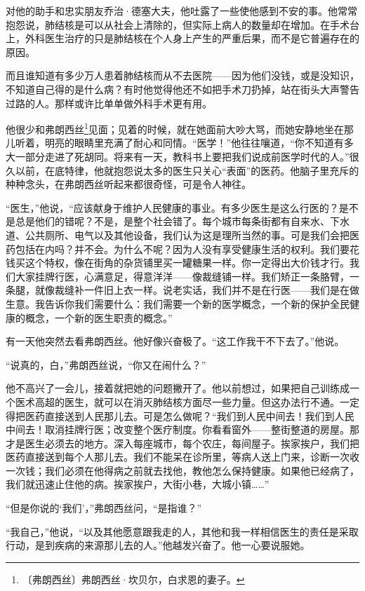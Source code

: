\documentclass[12pt,UTF-8,openany]{ctexbook}
\begin{document}
\begin{normalsize}
    对他的助手和忠实朋友乔治·德塞大夫，他吐露了一些使他感到不安的事。他常常抱怨说，肺结核是可以从社会上清除的，但实际上病人的数量却在增加。在手术台上，外科医生治疗的只是肺结核在个人身上产生的严重后果，而不是它普遍存在的原因。
    
    而且谁知道有多少万人患着肺结核而从不去医院——因为他们没钱，或是没知识，不知道自己得的是什么病？有时他觉得他还不如把手术刀扔掉，站在街头大声警告过路的人。那样或许比单单做外科手术更有用。
    
    他很少和弗朗西丝\footnote{〔弗朗西丝〕弗朗西丝·坎贝尔，白求恩的妻子。}见面；见着的时候，就在她面前大吵大骂，而她安静地坐在那儿听着，明亮的眼睛里充满了耐心和同情。“医学！”他往往嚷道，“你不知道有多大一部分走进了死胡同。将来有一天，教科书上要把我们说成前医学时代的人。”很久以前，在底特律，他就抱怨说太多的医生只关心“表面”的医药。他脑子里充斥的种种念头，在弗朗西丝听起来都很奇怪，可是令人神往。
    
    “医生，”他说，“应该献身于维护人民健康的事业。有多少医生是这么行医的？是不是总是他们的错呢？不是，是整个社会错了。每个城市每条街都有自来水、下水道、公共厕所、电气以及其他设备，我们认为这是理所当然的事。可是我们会把医药包括在内吗？并不会。为什么不呢？因为人没有享受健康生活的权利。我们要花钱买这个特权，像在街角的杂货铺里买一罐糖果一样。你一定得出大价钱才行。我们大家挂牌行医，心满意足，得意洋洋——像裁缝铺一样。我们矫正一条胳臂，一条腿，就像裁缝补一件旧上衣一样。说老实话，我们并不是在行医——我们是在做生意。我告诉你我们需要什么：我们需要一个新的医学概念，一个新的保护全民健康的概念，一个新的医生职责的概念。”
    
    有一天他突然去看弗朗西丝。他好像兴奋极了。“这工作我干不下去了。”他说。
    
    “说真的，白，”弗朗西丝说，“你又在闹什么？”
    
    他不高兴了一会儿，接着就把她的问题撇开了。他以前想过，如果把自己训练成一个医术高超的医生，就可以在消灭肺结核方面尽一些力量。但这办法行不通。一定得把医药直接送到人民那儿去。可是怎么做呢？“我们到人民中间去！我们到人民中间去！取消挂牌行医；改变整个医疗制度。你看看窗外——整街整道的房屋。那才是医生必须去的地方。深入每座城市，每个农庄，每间屋子。挨家挨户，我们把医药直接送到每个人那儿去。我们不能呆在诊所里，等病人送上门来，诊断一次收一次钱；我们必须在他得病之前就去找他，教他怎么保持健康。如果他已经病了，我们就迅速止住他的病。挨家挨户，大街小巷，大城小镇……”
    
    “但是你说的‘我们’，”弗朗西丝问，“是指谁？”
    
    “我自己，”他说，“以及其他愿意跟我走的人，其他和我一样相信医生的责任是采取行动，是到疾病的来源那儿去的人。”他越发兴奋了。他一心要说服她。
    

\end{normalsize}
\end{document}
